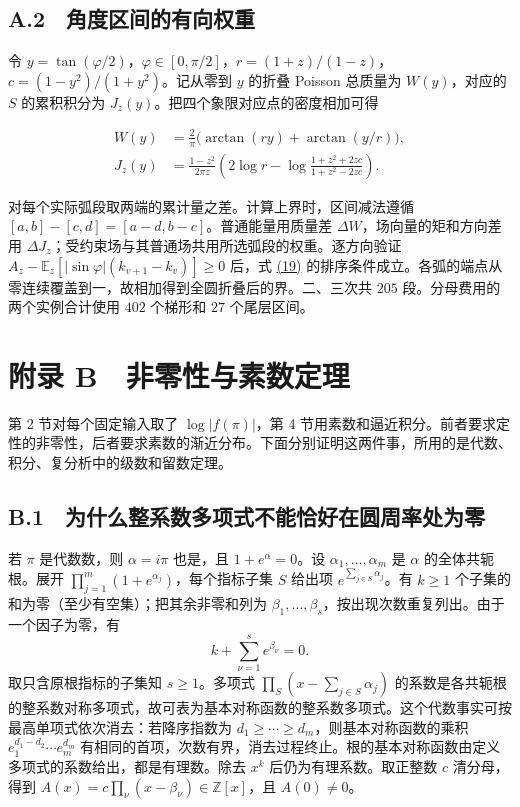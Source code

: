\documentclass[11pt,a4paper]{article}
\begin{document}
\subsection{A.2　角度区间的有向权重}
令 \(y=\tan(\varphi/2)\)，\(\varphi\in[0,\pi/2]\)，\(r=(1+z)/(1-z)\)，\(c=(1-y^2)/(1+y^2)\)。记从零到 \(y\) 的折叠 Poisson 总质量为 \(W(y)\)，对应的 \(S\) 的累积积分为 \(J_z(y)\)。把四个象限对应点的密度相加可得

\[
 \begin{aligned}
 W(y)&=\frac2\pi\big(\arctan(ry)+\arctan(y/r)\big),\\
 J_z(y)&=\frac{1-z^2}{2\pi z}\left(2\log r-
            \log\frac{1+z^2+2zc}{1+z^2-2zc}\right).
 \end{aligned}                                                            \tag{27}\label{eq:27}
\]

对每个实际弧段取两端的累计量之差。计算上界时，区间减法遵循 \([a,b]-[c,d]=[a-d,b-c]\)。普通能量用质量差 \(\Delta W\)，场向量的矩和方向差用 \(\Delta J_z\)；受约束场与其普通场共用所选弧段的权重。逐方向验证 \(A_z-\mathbb E_z[|\sin\varphi|(k_{v+1}-k_v)]\ge0\) 后，式 \hyperref[eq:19]{(19)} 的排序条件成立。各弧的端点从零连续覆盖到一，故相加得到全圆折叠后的界。二、三次共 \(205\) 段。分母费用的两个实例合计使用 \(402\) 个梯形和 \(27\) 个尾层区间。


\section{附录 B　非零性与素数定理}\label{ux9644ux5f55-c-ux4e24ux4e2aux7528ux5f97ux5230ux7684ux80ccux666fux5b9aux7406}

第 2 节对每个固定输入取了 \(\log|f(\pi)|\)，第 4 节用素数和逼近积分。前者要求定性的非零性，后者要求素数的渐近分布。下面分别证明这两件事，所用的是代数、积分、复分析中的级数和留数定理。

\subsection{B.1　为什么整系数多项式不能恰好在圆周率处为零}\label{c.1-ux4e3aux4ec0ux4e48ux6574ux7cfbux6570ux591aux9879ux5f0fux4e0dux80fdux6070ux597dux5728ux5706ux5468ux7387ux5904ux4e3aux96f6}

若 \(\pi\) 是代数数，则 \(\alpha=i\pi\) 也是，且 \(1+e^\alpha=0\)。设 \(\alpha_1,\ldots,\alpha_m\) 是 \(\alpha\) 的全体共轭根。展开 \(\prod_{j=1}^m(1+e^{\alpha_j})\)，每个指标子集 \(S\) 给出项 \(e^{\sum_{j\in S}\alpha_j}\)。有 \(k\ge1\) 个子集的和为零（至少有空集）；把其余非零和列为 \(\beta_1,\ldots,\beta_s\)，按出现次数重复列出。由于一个因子为零，有 \[
 k+\sum_{\nu=1}^s e^{\beta_\nu}=0 .
\] 取只含原根指标的子集知 \(s\ge1\)。多项式 \(\prod_S(x-\sum_{j\in S}\alpha_j)\) 的系数是各共轭根的整系数对称多项式，故可表为基本对称函数的整系数多项式。这个代数事实可按最高单项式依次消去：若降序指数为 \(d_1\ge\cdots\ge d_m\)，则基本对称函数的乘积 \(e_1^{d_1-d_2}\cdots e_m^{d_m}\) 有相同的首项，次数有界，消去过程终止。根的基本对称函数由定义多项式的系数给出，都是有理数。除去 \(x^k\) 后仍为有理系数。取正整数 \(c\) 清分母，得到 \(A(x)=c\prod_\nu(x-\beta_\nu)\in\mathbb Z[x]\)，且 \(A(0)\ne0\)。
\end{document}
